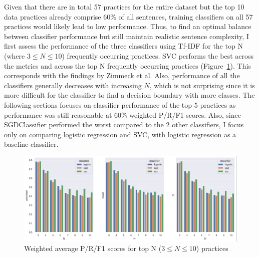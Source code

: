 Given that there are in total 57 practices for the entire dataset but the top 10 data practices already comprise 60\% of all sentences, training classifiers on all 57 practices would likely lead to low performance. Thus, to find an optimal balance between classifier performance but still maintain realistic sentence complexity, I first assess the performance of the three classifiers using Tf-IDF for the top N (where $3 \le N \le 10$) frequently occurring practices. SVC performs the best across the metrics and across the top N frequently occurring practices (Figure~\ref{fig:top_n_practices}). This corresponds with the findings by Zimmeck et al. Also, performance of all the classifiers generally decreases with increasing $N$, which is not surprising since it is more difficult for the classifier to find a decision boundary with more classes. The following sections focuses on classifier performance of the top 5 practices as performance was still reasonable at 60\% weighted P/R/F1 scores. Also, since SGDClassifier performed the worst compared to the 2 other classifiers, I focus only on comparing logistic regression and SVC, with logistic regression as a baseline classifier.

\begin{figure}[!ht]
	\centering
	\includegraphics[width=1\textwidth]{figures/model_n_testing_sentence.png}      
    \caption{Weighted average P/R/F1 scores for top N ($3 \le N \le 10$) practices}
    \label{fig:top_n_practices}
\end{figure}


